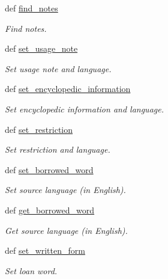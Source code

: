 \begin{DoxyCompactItemize}
def \hyperlink{classlmf_1_1src_1_1core_1_1lexical__entry_1_1_lexical_entry_afd1942b2ace38b2e6522c9b1c55a17f3}{find\+\_\+notes}
\begin{DoxyCompactList}\small\item\em Find notes. \end{DoxyCompactList}\item 
def \hyperlink{classlmf_1_1src_1_1core_1_1lexical__entry_1_1_lexical_entry_aaf37b80eaa95fb2fc6e8a20e5cf3e023}{set\+\_\+usage\+\_\+note}
\begin{DoxyCompactList}\small\item\em Set usage note and language. \end{DoxyCompactList}\item 
def \hyperlink{classlmf_1_1src_1_1core_1_1lexical__entry_1_1_lexical_entry_af08e4e9e77021330f1a093e7e0fe7a36}{set\+\_\+encyclopedic\+\_\+information}
\begin{DoxyCompactList}\small\item\em Set encyclopedic information and language. \end{DoxyCompactList}\item 
def \hyperlink{classlmf_1_1src_1_1core_1_1lexical__entry_1_1_lexical_entry_a39a8812156d3d5710691ca427cd7fd6f}{set\+\_\+restriction}
\begin{DoxyCompactList}\small\item\em Set restriction and language. \end{DoxyCompactList}\item 
def \hyperlink{classlmf_1_1src_1_1core_1_1lexical__entry_1_1_lexical_entry_a1530ee0141c9459719b0e07b65ccff82}{set\+\_\+borrowed\+\_\+word}
\begin{DoxyCompactList}\small\item\em Set source language (in English). \end{DoxyCompactList}\item 
def \hyperlink{classlmf_1_1src_1_1core_1_1lexical__entry_1_1_lexical_entry_a0cc51d09a44392de1065c5a94e1da39d}{get\+\_\+borrowed\+\_\+word}
\begin{DoxyCompactList}\small\item\em Get source language (in English). \end{DoxyCompactList}\item 
def \hyperlink{classlmf_1_1src_1_1core_1_1lexical__entry_1_1_lexical_entry_a14705c1acad6100ea1adbbe6b89e0f22}{set\+\_\+written\+\_\+form}
\begin{DoxyCompactList}\small\item\em Set loan word. \end{DoxyCompactList}\item 

\end{DoxyCompactItemize}
